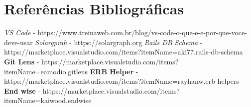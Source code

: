 
\chapter{Referências Bibliográficas}


\textit{VS Code} - https://www.treinaweb.com.br/blog/vs-code-o-que-e-e-por-que-voce-deve-usar
\textit{Solargprah} - https://solargraph.org
\textit{Rails DB Schema} - https://marketplace.visualstudio.com/items?itemName=aki77.rails-db-schema
\textbf{Git Lens} - https://marketplace.visualstudio.com/items?itemName=eamodio.gitlens
\textbf{ERB Helper} - https://marketplace.visualstudio.com/items?itemName=rayhanw.erb-helpers
\textbf{End wise} - https://marketplace.visualstudio.com/items?itemName=kaiwood.endwise

